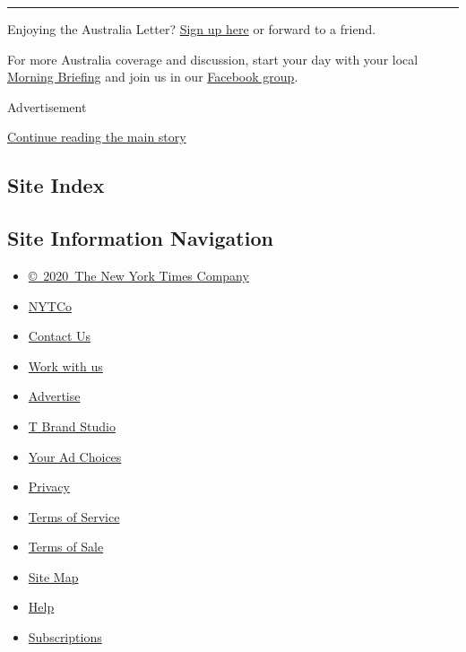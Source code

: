\begin{center}\rule{0.5\linewidth}{\linethickness}\end{center}

Enjoying the Australia Letter?
\href{https://www.nytimes.com/newsletters/australia-letter?utm_source=ausend}{Sign
up here} or forward to a friend.

For more Australia coverage and discussion, start your day with your
local
\href{https://www.nytimes.com/interactive/2018/briefing/global-morning-briefing-newsletter-signup.html?utm_source=ausend}{Morning
Briefing} and join us in our
\href{https://www.facebook.com/groups/nytaustralia/}{Facebook group}.

Advertisement

\protect\hyperlink{after-bottom}{Continue reading the main story}

\hypertarget{site-index}{%
\subsection{Site Index}\label{site-index}}

\hypertarget{site-information-navigation}{%
\subsection{Site Information
Navigation}\label{site-information-navigation}}

\begin{itemize}
\tightlist
\item
  \href{https://help.nytimes.com/hc/en-us/articles/115014792127-Copyright-notice}{©~2020~The
  New York Times Company}
\end{itemize}

\begin{itemize}
\tightlist
\item
  \href{https://www.nytco.com/}{NYTCo}
\item
  \href{https://help.nytimes.com/hc/en-us/articles/115015385887-Contact-Us}{Contact
  Us}
\item
  \href{https://www.nytco.com/careers/}{Work with us}
\item
  \href{https://nytmediakit.com/}{Advertise}
\item
  \href{http://www.tbrandstudio.com/}{T Brand Studio}
\item
  \href{https://www.nytimes.com/privacy/cookie-policy\#how-do-i-manage-trackers}{Your
  Ad Choices}
\item
  \href{https://www.nytimes.com/privacy}{Privacy}
\item
  \href{https://help.nytimes.com/hc/en-us/articles/115014893428-Terms-of-service}{Terms
  of Service}
\item
  \href{https://help.nytimes.com/hc/en-us/articles/115014893968-Terms-of-sale}{Terms
  of Sale}
\item
  \href{https://spiderbites.nytimes.com}{Site Map}
\item
  \href{https://help.nytimes.com/hc/en-us}{Help}
\item
  \href{https://www.nytimes.com/subscription?campaignId=37WXW}{Subscriptions}
\end{itemize}
